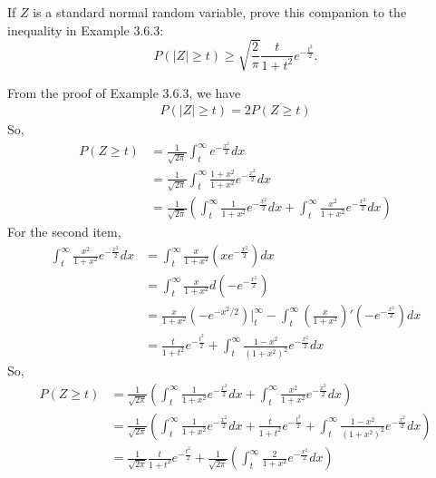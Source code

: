 \documentclass[14pt]{elegantbook}
\begin{document}
    \setcounter{exer}{46}
    \begin{exercise}
        If $Z$ is a standard normal random variable, prove this companion to the inequality in Example 3.6.3: 
        \[
            P(|Z|\geq t)\geq\sqrt{\frac{2}{\pi}}\frac{t}{1+t^2}e^{-\frac{t^2}{2}}.
        \]
    \end{exercise}

    \begin{solution}
        From the proof of Example 3.6.3, we have
        \begin{align*}
            P(|Z|\geq t)=2P(Z\geq t)
        \end{align*}
        So, \begin{align*}
            P(Z\geq t)&=\frac{1}{\sqrt{2\pi}}\int_{t}^{\infty}e^{-\frac{x^2}{2}}dx\\
            &=\frac{1}{\sqrt{2\pi}}\int_{t}^{\infty}\frac{1+x^2}{1+x^2}e^{-\frac{x^2}{2}}dx\\
            &=\frac{1}{\sqrt{2\pi}}\left(\int_{t}^{\infty}\frac{1}{1+x^2}e^{-\frac{x^2}{2}}dx+\int_{t}^{\infty}\frac{x^2}{1+x^2}e^{-\frac{x^2}{2}}dx\right)
        \end{align*}
        For the second item, 
        \begin{align*}
            \int_{t}^{\infty}\frac{x^2}{1+x^2}e^{-\frac{x^2}{2}}dx&=\int_{t}^{\infty}\frac{x}{1+x^2}\left(xe^{-\frac{x^2}{2}}\right)dx\\
            &=\int_{t}^{\infty}\frac{x}{1+x^2}d\left(-e^{-\frac{x^2}{2}}\right)\\
            &=\frac{x}{1+x^2}(-e^{-x^2/2})\Big |_t^\infty - \int_{t}^{\infty}\left(\frac{x}{1+x^2}\right)'(-e^{-\frac{x^2}{2}})dx\\
            &=\frac{t}{1+t^2}e^{-\frac{t^2}{2}}+\int_t^\infty\frac{1-x^2}{(1+x^2)^2}e^{-\frac{x^2}{2}}dx
        \end{align*}
        So, \begin{align*}
            P(Z\geq t)&=\frac{1}{\sqrt{2\pi}}\left(\int_{t}^{\infty}\frac{1}{1+x^2}e^{-\frac{x^2}{2}}dx+\int_{t}^{\infty}\frac{x^2}{1+x^2}e^{-\frac{x^2}{2}}dx\right)\\
            &=\frac{1}{\sqrt{2\pi}}\left(\int_{t}^{\infty}\frac{1}{1+x^2}e^{-\frac{x^2}{2}}dx+\frac{t}{1+t^2}e^{-\frac{t^2}{2}}+\int_{t}^{\infty}\frac{1-x^2}{(1+x^2)^2}e^{-\frac{x^2}{2}}dx\right)\\
            &=\frac{1}{\sqrt{2\pi}}\frac{t}{1+t^2}e^{-\frac{t^2}{2}}+\frac{1}{\sqrt{2\pi}}\left(\int_{t}^{\infty}\frac{2}{1+x^2}e^{-\frac{x^2}{2}}dx\right)

\end{align*}
\end{solution}
\end{document}
